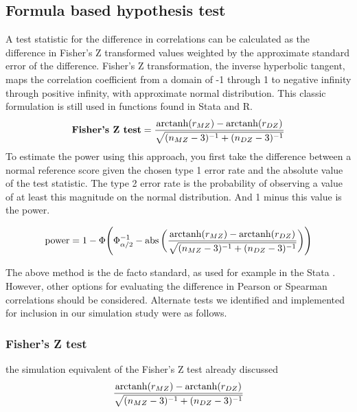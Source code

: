 \subsection{Formula based hypothesis test}
A test statistic for the difference in correlations can be calculated as the difference in Fisher's Z transformed values weighted by the approximate standard error of the difference.  Fisher's Z transformation, the inverse hyperbolic tangent, maps the correlation coefficient from a domain of -1 through 1 to negative infinity through positive infinity, with approximate normal distribution.  This classic formulation is still used in functions found in Stata and R.
 $$\textbf{Fisher's Z test} = \frac{\operatorname{arctanh}(r_{MZ}) - \operatorname{arctanh}(r_{DZ})}{\sqrt{(n_{MZ}-3)^{-1} + (n_{DZ}-3)^{-1}}}$$
To estimate the power using this approach, you first take the difference between a normal reference score given the chosen type 1 error rate and the absolute value of the test statistic. The type 2 error rate is the probability of observing a value of at least this magnitude on the normal distribution.  And 1 minus this value is the power.

$$ \operatorname{power} = 1- \Phi \Bigg(\Phi_{\alpha/2}^{-1} -  \operatorname{abs}\bigg(  \frac{\operatorname{arctanh}(r_{MZ}) - \operatorname{arctanh}(r_{DZ})}{\sqrt{(n_{MZ}-3)^{-1} + (n_{DZ}-3)^{-1}}}  \bigg)  \Bigg) $$ 

The above method is the de facto standard, as used for example in the Stata .  However, other options for evaluating the difference in Pearson or Spearman correlations should be considered.  Alternate tests we identified and implemented for inclusion in our simulation study were as follows. 
\subsubsection{Fisher's Z test}
the simulation equivalent of the Fisher's Z test already discussed
 $$\frac{\operatorname{arctanh}(r_{MZ}) - \operatorname{arctanh}(r_{DZ})}{\sqrt{(n_{MZ}-3)^{-1} + (n_{DZ}-3)^{-1}}}$$

